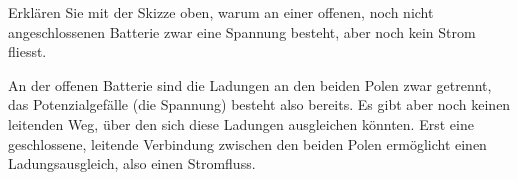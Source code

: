 \begin{questions}
\needspace{6cm}
\begin{taskbox}
\question[3] Erklären Sie mit der Skizze oben, warum an einer offenen,
noch nicht angeschlossenen Batterie zwar eine Spannung besteht, aber noch
kein Strom fliesst.
\begin{answerbox}
\vspace{2.4cm}
\end{answerbox}
\begin{solution}
An der offenen Batterie sind die Ladungen an den beiden Polen zwar
getrennt, das Potenzialgefälle (die Spannung) besteht also bereits. Es
gibt aber noch keinen leitenden Weg, über den sich diese Ladungen
ausgleichen könnten. Erst eine geschlossene, leitende Verbindung zwischen
den beiden Polen ermöglicht einen Ladungsausgleich, also einen
Stromfluss.
\end{solution}
\end{taskbox}
\end{questions}

